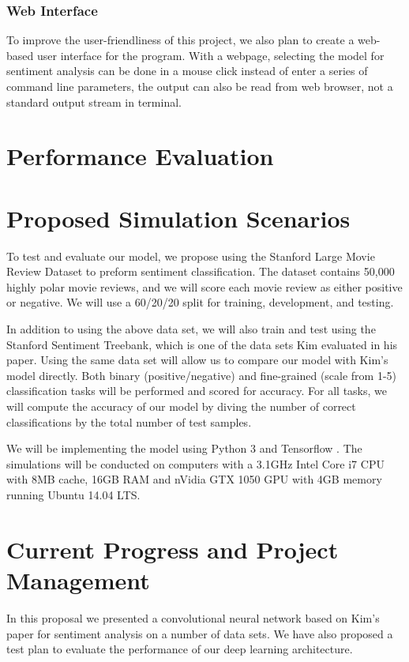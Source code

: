\documentclass[conference]{IEEEtran}
\begin{document}
\subsubsection{Web Interface}
\label{model:stretch:web}
    To improve the user-friendliness of this project, we also plan to create a 
    web-based user interface for the program. With a webpage, selecting
    the model for sentiment analysis can be done in a mouse click instead of 
    enter a series of command line parameters, the output can also
    be read from web browser, not a standard output stream in terminal. 

\section{Performance Evaluation}
\label{performance}


\section{Proposed Simulation Scenarios}
\label{scenarios}
    To test and evaluate our model, we propose using the Stanford Large Movie Review
    Dataset to preform sentiment classification\cite{maas2011learning}.
    The dataset contains 50,000 highly polar
    movie reviews, and we will score each movie review as either positive or
    negative. We will use a 60/20/20 split for training, development, and testing.

    In addition to using the above data set, we will also train and test using the 
    Stanford Sentiment Treebank, which is one of the data sets Kim evaluated in 
    his paper\cite{sentimenttreebank}. Using the same data set
    will allow us to compare our model with Kim's model directly. 
    Both binary (positive/negative) and fine-grained (scale from 1-5) 
    classification tasks will be performed and scored for accuracy.
    For all tasks, we will compute the accuracy of our model by diving the 
    number of correct classifications by the total number of test samples.

    We will be implementing the model using Python 3 and Tensorflow
    \cite{tensorflow2015-whitepaper}. The 
    simulations will be conducted on computers with a 3.1GHz Intel Core i7 
    CPU with 8MB cache, 16GB RAM and nVidia GTX 1050 GPU with 4GB memory 
    running Ubuntu 14.04 LTS.

\section{Current Progress and Project Management}
\label{manage}

    In this proposal we presented a convolutional neural network based on 
    Kim's paper for sentiment analysis on a number of data sets. We have 
    also proposed a test plan to evaluate the performance of our deep 
    learning architecture.



\end{document}
